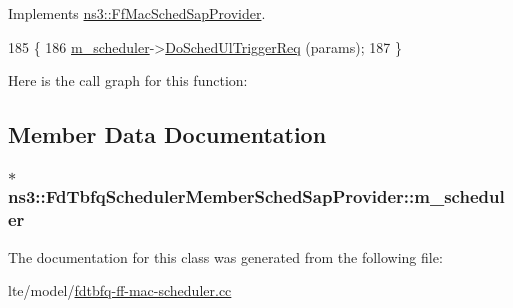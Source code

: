 Implements \hyperlink{classns3_1_1FfMacSchedSapProvider_a7bd978ea17a587a1626ef684be006c04}{ns3\+::\+Ff\+Mac\+Sched\+Sap\+Provider}.


\begin{DoxyCode}
185 \{
186   \hyperlink{classns3_1_1FdTbfqSchedulerMemberSchedSapProvider_a796c8957deb5d1f76995f917d68fc1a3}{m\_scheduler}->\hyperlink{classns3_1_1FdTbfqFfMacScheduler_a393439d7b65f01d14f335b1cf3fc8423}{DoSchedUlTriggerReq} (params);
187 \}
\end{DoxyCode}


Here is the call graph for this function\+:




\subsection{Member Data Documentation}
\subsubsection[{\texorpdfstring{m\+\_\+scheduler}{m_scheduler}}]{$\ast$ ns3\+::\+Fd\+Tbfq\+Scheduler\+Member\+Sched\+Sap\+Provider\+::m\+\_\+scheduler\hspace{0.3cm}{\ttfamily [private]}}\hypertarget{classns3_1_1FdTbfqSchedulerMemberSchedSapProvider_a796c8957deb5d1f76995f917d68fc1a3}{}\label{classns3_1_1FdTbfqSchedulerMemberSchedSapProvider_a796c8957deb5d1f76995f917d68fc1a3}


The documentation for this class was generated from the following file\+:\begin{DoxyCompactItemize}
\item 
lte/model/\hyperlink{fdtbfq-ff-mac-scheduler_8cc}{fdtbfq-\/ff-\/mac-\/scheduler.\+cc}\end{DoxyCompactItemize}
